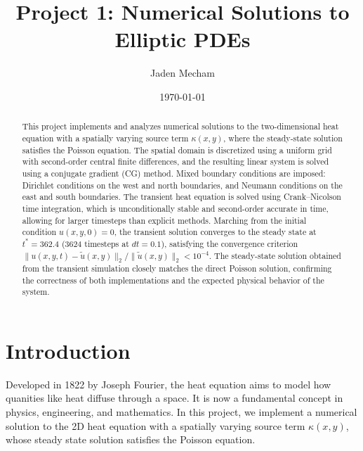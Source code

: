\documentclass[
  aapm,
  amsmath,amssymb,
  reprint,          %
  floatfix
]{revtex4-2}
\begin{document}
\title{Project 1: Numerical Solutions to Elliptic PDEs} %

\author{Jaden Mecham}

\date{\today}

\begin{abstract}
  This project implements and analyzes numerical solutions to the two-dimensional heat equation
  with a spatially varying source term $\kappa(x,y)$, where the steady-state solution satisfies
  the Poisson equation. The spatial domain is discretized using a uniform grid with second-order
  central finite differences, and the resulting linear system is solved using a conjugate gradient
  (CG) method. Mixed boundary conditions are imposed: Dirichlet conditions on the west and north
  boundaries, and Neumann conditions on the east and south boundaries. The transient heat equation
  is solved using Crank--Nicolson time integration, which is unconditionally stable and
  second-order accurate in time, allowing for larger timesteps than explicit methods. Marching
  from the initial condition $u(x,y,0) = 0$, the transient solution converges to the steady state
  at $t^* = 362.4$ (3624 timesteps at $dt = 0.1$), satisfying the convergence criterion
  $\|u(x,y,t) - \tilde{u}(x,y)\|_2 / \|\tilde{u}(x,y)\|_2 < 10^{-4}$. The steady-state
  solution obtained from the transient simulation closely matches the direct Poisson solution,
  confirming the correctness of both implementations and the expected physical behavior of the
  system.
\end{abstract}

\maketitle


\section{Introduction}

Developed in 1822 by Joseph Fourier, the heat equation aims to model how quanities like heat
diffuse through a space. It is now a fundamental concept in physics, engineering, and 
mathematics. In this project, we implement a numerical solution to the 2D heat equation with 
a spatially varying source term $\kappa(x,y)$, whose steady state solution satisfies the 
Poisson equation.
\end{document}
